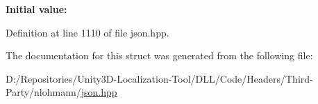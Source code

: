 {\bfseries Initial value\+:}
\begin{DoxyCode}{0}
\DoxyCodeLine{=}

\end{DoxyCode}


Definition at line 1110 of file json.\+hpp.



The documentation for this struct was generated from the following file\+:\begin{DoxyCompactItemize}
\item 
D\+:/\+Repositories/\+Unity3\+D-\/\+Localization-\/\+Tool/\+D\+L\+L/\+Code/\+Headers/\+Third-\/\+Party/nlohmann/\mbox{\hyperlink{json_8hpp}{json.\+hpp}}\end{DoxyCompactItemize}
